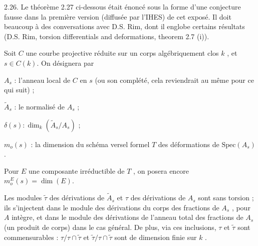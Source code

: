 2.26. Le théorème 2.27 ci-dessous était énoncé sous la forme d'une conjecture fausse dans la première version (diffusée par l'IHES) de cet exposé. Il doit beaucoup à des conversations avec D.S. Rim, dont il englobe certains résultats (D.S. Rim, torsion differentials and deformations, theorem 2.7 (i)).



Soit  $C$  une courbe projective réduite sur un corps algébriquement clos  $k$ , et  $s \in C(k)$. On désignera par

$A_{s}$ : l'anneau local de  $C$  en  $s$  (ou son complété, cela reviendrait au même pour ce qui suit) ;

$\widetilde{A}_{s}$ : le normalisé de  $A_{s}$ ;

$\delta(s):\dim_{k}(\widetilde{A}_{s}/A_{s})$  ;

$m_{o}(s)$ : la dimension du schéma versel formel  $T$  des déformations de $\mathrm{Spec}(A_{s})$.

Pour  $E$  une composante irréductible de  $T$ , on posera encore $m_{o}^{E}(s) = \dim(E)$.

Les modules  $\widetilde{\tau}$  des dérivations de  $\widetilde{A}_{s}$  et  $\tau$  des dérivations de  $A_{s}$  sont sans torsion ; ils s'injectent dans le module des dérivations du corps des fractions de  $A_{s}$ , pour  $A$  intègre, et dans le module des dérivations de l'anneau total des fractions de  $A_{s}$  (un produit de corps) dans le cas général. De plus, via ces inclusions,  $\tau$  et  $\widetilde{\tau}$  sont commensurables : $\tau/\tau\cap\widetilde{\tau}$  et  $\widetilde{\tau}/\tau\cap\widetilde{\tau}$  sont de dimension finie sur  $k$ .

